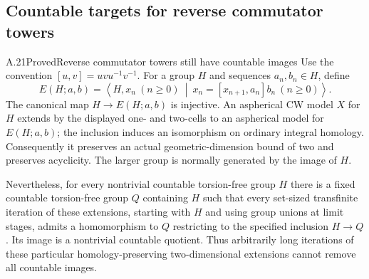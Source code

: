 \subsection{Countable targets for reverse commutator towers}

\begin{claim}{A.21}{Proved}{Reverse commutator towers still have countable images}
Use the convention $[u,v]=uvu^{-1}v^{-1}$. For a group $H$ and
sequences $a_n,b_n\in H$, define
\[
 E(H;a,b)=\left\langle H,x_n\ (n\geq0)\ \middle|\
 x_n=[x_{n+1},a_n]b_n\ (n\geq0)\right\rangle.
\]
The canonical map $H\to E(H;a,b)$ is injective. An aspherical CW
model $X$ for $H$ extends by the displayed one- and two-cells to
an aspherical model for $E(H;a,b)$; the inclusion induces an
isomorphism on ordinary integral homology. Consequently it preserves
an actual geometric-dimension bound of two and preserves acyclicity.
The larger group is normally generated by the image of $H$.

Nevertheless, for every nontrivial countable torsion-free group $H$
there is a fixed countable torsion-free group $Q$ containing $H$
such that every set-sized transfinite iteration of these extensions,
starting with $H$ and using group unions at limit stages, admits a
homomorphism to $Q$ restricting to the specified inclusion $H\to Q$.
Its image is a nontrivial countable quotient. Thus arbitrarily long
iterations of these particular homology-preserving two-dimensional
extensions cannot remove all countable images.
\end{claim}
